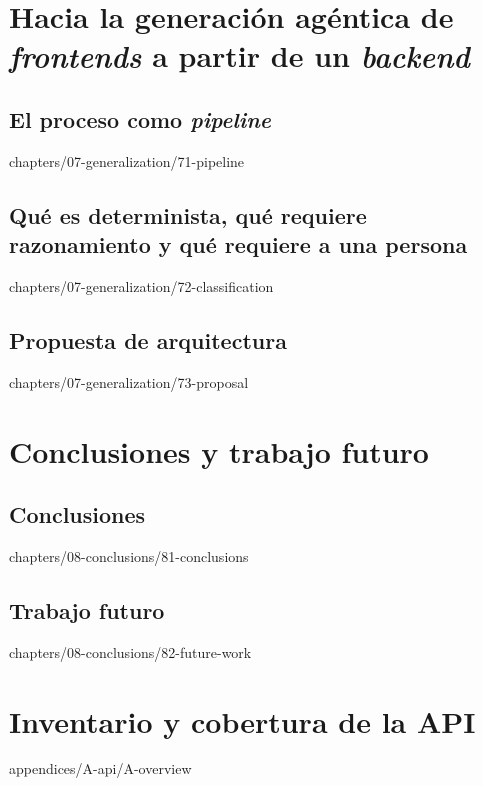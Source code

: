 \documentclass[epsbased,tfg,covers,final,printable,extendedindex,%
               firstnumbered,lof,lot,loc]{tfgtfmthesisuam}
\begin{document}
\chapter[Hacia la generación agéntica de frontends]%
        {Hacia la generación agéntica de \textit{frontends} a partir
         de un \textit{backend}\label{CAP:GENERALIZATION}}
  \section{El proceso como \textit{pipeline}\label{SEC:GEN-PIPELINE}}%
          {chapters/07-generalization/71-pipeline}
  \section[Qué es determinista y qué requiere razonamiento]%
          {Qué es determinista, qué requiere razonamiento y qué
           requiere a una persona\label{SEC:GEN-CLASSIFICATION}}%
          {chapters/07-generalization/72-classification}
  \section{Propuesta de arquitectura\label{SEC:GEN-PROPOSAL}}%
          {chapters/07-generalization/73-proposal}

\chapter{Conclusiones y trabajo futuro\label{CAP:CONCLUSIONS}}
  \section{Conclusiones\label{SEC:CONC-CONCLUSIONS}}%
          {chapters/08-conclusions/81-conclusions}
  \section{Trabajo futuro\label{SEC:CONC-FUTURE}}%
          {chapters/08-conclusions/82-future-work}

\appendix

\chapter{Inventario y cobertura de la API\label{AP:API}}%
        {appendices/A-api/A-overview}
\end{document}

